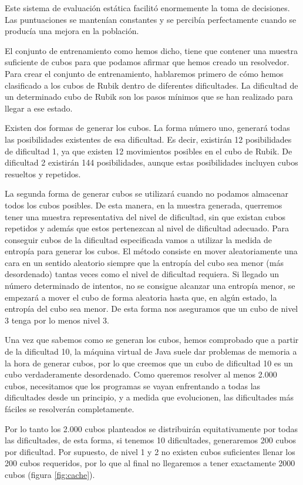 Este sistema de evaluación estática facilitó enormemente la toma de decisiones.
Las puntuaciones se mantenían constantes y se percibía perfectamente cuando se
producía una mejora en la población.

El conjunto de entrenamiento como hemos dicho, tiene que contener una muestra
suficiente de cubos para que podamos afirmar que hemos creado un resolvedor. Para
crear el conjunto de entrenamiento, hablaremos primero de cómo hemos clasificado
a los cubos de Rubik dentro de diferentes dificultades.  La dificultad de un
determinado cubo de Rubik son los pasos mínimos que se han realizado para llegar
a ese estado.

Existen dos formas de generar los cubos. La forma número uno, generará todas las
posibilidades existentes de esa dificultad. Es decir, existirán 12 posibilidades
de dificultad 1, ya que existen 12 movimientos posibles en el cubo de Rubik. De
dificultad 2 existirán 144 posibilidades, aunque estas posibilidades incluyen
cubos resueltos y repetidos.

La segunda forma de generar cubos se utilizará cuando no podamos almacenar todos
los cubos posibles. De esta manera, en la muestra generada, querremos tener una
muestra representativa del nivel de dificultad, sin que existan cubos repetidos y
además que estos pertenezcan al nivel de dificultad adecuado. Para conseguir
cubos de la dificultad especificada vamos a utilizar la medida de entropía para
generar los cubos. El método consiste en mover aleatoriamente una cara en un
sentido aleatorio siempre que la entropía del cubo sea menor (más desordenado)
tantas veces como el nivel de dificultad requiera. Si llegado un número
determinado de intentos, no se consigue alcanzar una entropía menor, se empezará
a mover el cubo de forma aleatoria hasta que, en algún estado, la entropía del
cubo sea menor. De esta forma nos aseguramos que un cubo de nivel 3 tenga por lo
menos nivel 3.

Una vez que sabemos como se generan los cubos, hemos comprobado que a partir de
la dificultad 10, la máquina virtual de Java suele dar problemas de memoria a la
hora de generar cubos, por lo que creemos que un cubo de dificultad 10 es un cubo
verdaderamente desordenado. Como queremos resolver al menos 2.000 cubos,
necesitamos que los programas se vayan enfrentando a todas las dificultades desde
un principio, y a medida que evolucionen, las dificultades más fáciles se
resolverán completamente.

Por lo tanto los 2.000 cubos planteados se distribuirán equitativamente por todas
las dificultades, de esta forma, si tenemos 10 dificultades, generaremos 200
cubos por dificultad. Por supuesto, de nivel 1 y 2 no existen cubos suficientes
llenar los 200 cubos requeridos, por lo que al final no llegaremos a tener
exactamente 2000 cubos (figura \ref{fig:cache}).

